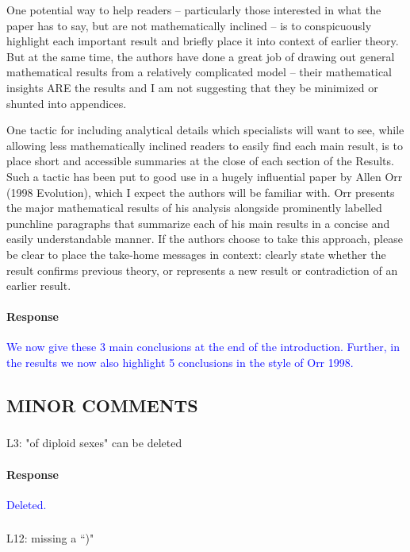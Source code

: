 \documentclass[10pt,letterpaper]{article}
\begin{document}
One potential way to help readers -- particularly those interested in what the paper has to say, but are not mathematically inclined -- is to conspicuously highlight each important result and briefly place it into context of earlier theory. But at the same time, the authors have done a great job of drawing out general mathematical results from a relatively complicated model -- their mathematical insights ARE the results and I am not suggesting that they be minimized or shunted into appendices.

One tactic for including analytical details which specialists will want to see, while allowing less mathematically inclined readers to easily find each main result, is to place short and accessible summaries at the close of each section of the Results. Such a tactic has been put to good use in a hugely influential paper by Allen Orr (1998 Evolution), which I expect the authors will be familiar with. Orr presents the major mathematical results of his analysis alongside prominently labelled punchline paragraphs that summarize each of his main results in a concise and easily understandable manner. If the authors choose to take this approach, please be clear to place the take-home messages in context: clearly state whether the result confirms previous theory, or represents a new result or contradiction of an earlier result.

\noindent\paragraph{Response}
\textcolor{blue}{We now give these 3 main conclusions at the end of the introduction. Further, in the results we now also highlight 5 conclusions in the style of Orr 1998.}

\subsection{MINOR COMMENTS}

\noindent\subsubsection{}
L3: "of diploid sexes" can be deleted

\noindent\paragraph{Response}
\textcolor{blue}{Deleted.}

\noindent\subsubsection{}
L12: missing a ``)"
\end{document}
